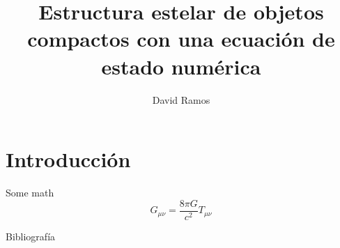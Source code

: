\documentclass[11pt]{beamer}
\title[Estructura estelar de objetos compactos]{Estructura estelar de objetos compactos con una ecuación de estado numérica}
\author[David Ramos]{David Ramos}
\begin{document}
	\typesetFrontSlides

\section{Introducción}
\begin{frame}{Some math}
    \begin{equation}
        G_{\mu\nu}=\frac{8\pi G}{c^2} T_{\mu\nu}
    \end{equation}
\end{frame}


\begin{frame}[plain]{Bibliografía}

\end{frame}
\end{document}

